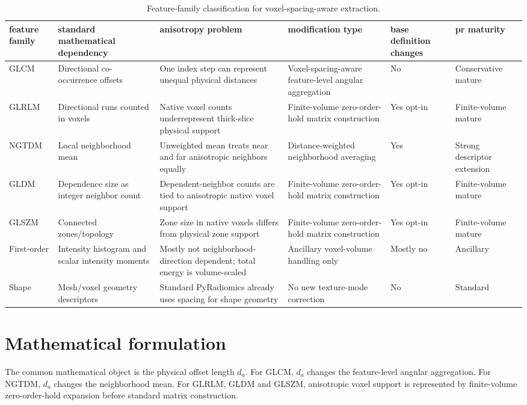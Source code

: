 \documentclass[11pt]{article}
\begin{document}
\begin{table}[t]
\centering
\small
\begin{tabular}{p{}p{}p{}p{}p{}p{}}
\toprule
feature family & standard mathematical dependency & anisotropy problem & modification type & base definition changes & pr maturity \\
\midrule
GLCM & Directional co-occurrence offsets & One index step can represent unequal physical distances & Voxel-spacing-aware feature-level angular aggregation & No & Conservative mature \\
GLRLM & Directional runs counted in voxels & Native voxel counts underrepresent thick-slice physical support & Finite-volume zero-order-hold matrix construction & Yes opt-in & Finite-volume mature \\
NGTDM & Local neighborhood mean & Unweighted mean treats near and far anisotropic neighbors equally & Distance-weighted neighborhood averaging & Yes & Strong descriptor extension \\
GLDM & Dependence size as integer neighbor count & Dependent-neighbor counts are tied to anisotropic native voxel support & Finite-volume zero-order-hold matrix construction & Yes opt-in & Finite-volume mature \\
GLSZM & Connected zones/topology & Zone size in native voxels differs from physical zone support & Finite-volume zero-order-hold matrix construction & Yes opt-in & Finite-volume mature \\
First-order & Intensity histogram and scalar intensity moments & Mostly not neighborhood-direction dependent; total energy is volume-scaled & Ancillary voxel-volume handling only & Mostly no & Ancillary \\
Shape & Mesh/voxel geometry descriptors & Standard PyRadiomics already uses spacing for shape geometry & No new texture-mode correction & No & Standard \\
\bottomrule
\end{tabular}
\caption{Feature-family classification for voxel-spacing-aware extraction.}
\label{tab:family-classification}
\end{table}

\section{Mathematical formulation}
The common mathematical object is the physical offset length \(d_a\). For GLCM, \(d_a\) changes the feature-level angular aggregation. For NGTDM, \(d_a\) changes the neighborhood mean. For GLRLM, GLDM and GLSZM, anisotropic voxel support is represented by finite-volume zero-order-hold expansion before standard matrix construction.
\end{document}
